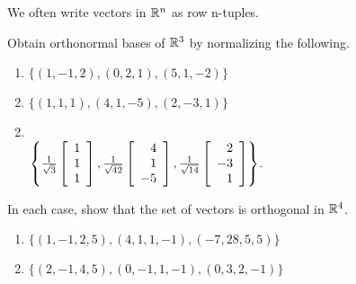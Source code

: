 \begin{multicols}{2}
\noindent We often write vectors in $\mathbb{R}^n$ as row n-tuples.
\begin{ex}
Obtain orthonormal bases of $\mathbb{R}^3$ by normalizing the following.

\begin{enumerate}[label={\alph*.}]
\item $\{(1, -1, 2), (0, 2, 1), (5, 1, -2)\}$

\item $\{(1, 1, 1), (4, 1, -5), (2, -3, 1)\}$

\end{enumerate}
\begin{sol}
\begin{enumerate}[label={\alph*.}]
\setcounter{enumi}{1}
\item \hspace{1em} \\
\hspace*{-2em}$
\left\{
\tfrac{1}{\sqrt{3}}
\left[ \begin{array}{r}
1\\
1\\
1
\end{array} \right], \tfrac{1}{\sqrt{42}}
\left[ \begin{array}{r}
4\\
1\\
-5
\end{array} \right], \tfrac{1}{\sqrt{14}}
\left[ \begin{array}{r}
2\\
-3\\
1
\end{array} \right]
\right\}
$.

\end{enumerate}
\end{sol}
\end{ex}

\begin{ex}
In each case, show that the set of vectors is orthogonal in $\mathbb{R}^4$.

\begin{enumerate}[label={\alph*.}]
\item $\{(1, -1, 2, 5), (4, 1, 1, -1), (-7, 28, 5, 5)\}$

\item $\{(2, -1, 4, 5), (0, -1, 1, -1), (0, 3, 2, -1)\}$

\end{enumerate}
\end{ex}


\end{multicols}

